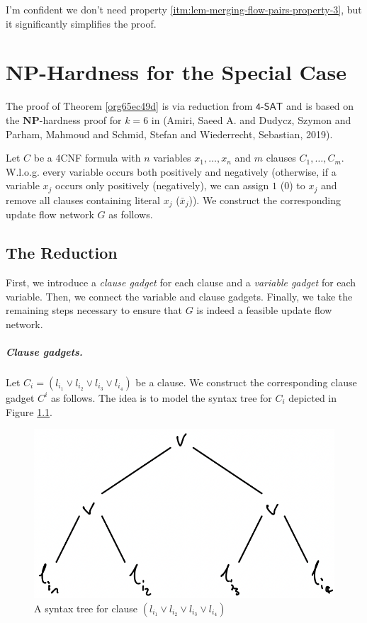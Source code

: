 \documentclass[fontsize=11pt,paper=a4]{book}
\begin{document}
\begin{remark}
I'm confident we don't need property \ref{itm:lem-merging-flow-pairs-property-3}, but it significantly simplifies the proof.
\end{remark}

\chapter{\(\textbf{NP}\)-Hardness for the Special Case}
\label{sec:org4acbd6a}

The proof of Theorem \ref{org65ec49d} is via reduction from \(\textsf{4-SAT}\) and is based on the \(\textbf{NP}\)-hardness proof for \(k=6\) in (Amiri, Saeed A. and Dudycz, Szymon and Parham, Mahmoud and Schmid, Stefan and Wiederrecht, Sebastian, 2019).

Let \(C\) be a 4CNF formula with \(n\) variables \(x_1,\dots,x_n\) and \(m\) clauses \(C_1,\dots,C_m\).
W.l.o.g. every variable occurs both positively and negatively (otherwise, if a variable \(x_j\) occurs only positively (negatively), we can assign \(1\) (\(0\)) to \(x_j\) and remove all clauses containing literal \(x_j\) (\(\bar{x}_j\))).
We construct the corresponding update flow network \(G\) as follows.

\section{The Reduction}
\label{sec:org9ac37d7}

First, we introduce a \emph{clause gadget} for each clause and a \emph{variable gadget} for each variable.
Then, we connect the variable and clause gadgets.
Finally, we take the remaining steps necessary to ensure that \(G\) is indeed a feasible update flow network.

\paragraph{Clause gadgets.}
Let \(C_i=(l_{i_1}\vee l_{i_2}\vee l_{i_3}\vee l_{i_4})\) be a clause.
We construct the corresponding clause gadget \(C^i\) as follows.
The idea is to model the syntax tree for \(C_i\) depicted in Figure \ref{fig:orge4d282e}.

\begin{figure}[htbp]
\centering
\includegraphics[width=.9\linewidth]{../assets/Screen Shot 2023-02-14 at 15.05.37.png}
\caption{\label{fig:orge4d282e}A syntax tree for clause \((l_{i_1}\vee l_{i_2}\vee l_{i_3}\vee l_{i_4})\)}
\end{figure}
\end{document}
